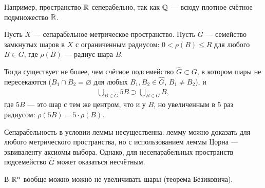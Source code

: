 Например, пространство $\mathbb{R}$ сеперабельно, так как $\mathbb{Q}$ --- всюду плотное счётное подмножество $\mathbb{R}$.

\begin{lm}[%
Витали]
\label{lemma:vitali}
Пусть $X$ --- сепарабельное метрическое пространство. Пусть $G$ --- семейство замкнутых шаров в $X$ с ограниченным радиусом: $0 < \rho(B) \leqslant R$ для любого $B \in G$, где $\rho(B)$ --- радиус шара $B$.

Тогда существует не более, чем счётное подсемейство $\hat G \subset G$, в котором шары не пересекаются ($B_1 \cap B_2 = \varnothing$ для любых $B_1, B_2 \in \hat G$, $B_1 \neq B_2$), и \begin{align*}
 \bigcup_{B \in \hat G}  5B \supset \bigcup_{B \in G} B
,\end{align*} где $5B$ --- это шар с тем же центром, что и у  $B$, но увеличенным в $5$ раз радиусом: $\rho(5B) = 5 \cdot \rho(B)$.
\end{lm}
\begin{remrk*}
 Сепарабельность в условии леммы несущественна: лемму можно доказать для любого метрического пространства, но с использованием леммы Цорна --- эквиваленту аксиомы выбора. Однако, для несепарабельных пространств подсемейство $\hat G$ может оказаться несчётным.
\end{remrk*}
\begin{remrk*}
В $\mathbb{R}^{n}$ вообще можно можно не увеличивать шары (теорема Безиковича).
\end{remrk*}
